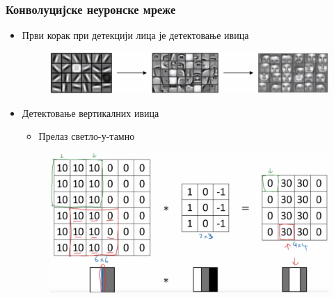 \begin{frame}
\frametitle{Конволуцијске неуронске мреже}
\begin{itemize}
 \item Први корак при детекцији лица је \alert{детектовање ивица}
 \begin{figure}[H]
  \centering
      \includegraphics[scale=0.2]{slike/ngEdge1.png}
 \end{figure}
 \item Детектовање \alert{вертикалних} ивица
 \begin{itemize}
  \item Прелаз \alert{светло-у-тамно}
 \end{itemize}

 \begin{figure}[H]
  \centering
      \includegraphics[scale=0.22]{slike/ngKonvoucijaVert.png}
 \end{figure}
\end{itemize}
\end{frame}

